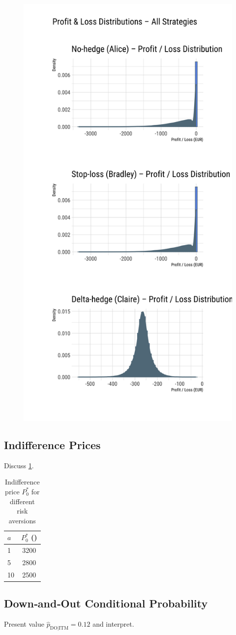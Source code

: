 \documentclass[11pt,a4paper]{article}
\begin{document}
\begin{figure}[H]
	\centering
	\includegraphics[width=0.5\linewidth]{figures/pnl_all_strategies.png}
	\label{fig:pnl_all_strategies}
\end{figure}
	\subsection{Indifference Prices}
	Discuss \cref{tab:indiff}.
	
	\begin{table}[H]
		\centering
		\caption{Indifference price $P_0^*$ for different risk aversions}
		\label{tab:indiff}
		\begin{tabular}{@{}lc@{}}
			\toprule
			$a$ & $P_0^*$ (\EUR{}) \\
			\midrule
			1 & 3200 \\
			5 & 2800 \\
			10 & 2500 \\
			\bottomrule
		\end{tabular}
	\end{table}
	
	\subsection{Down‑and‑Out Conditional Probability}
	Present value $\hat p_{\text{DO}|\text{ITM}}=0.12$ and interpret.
	
\end{document}
